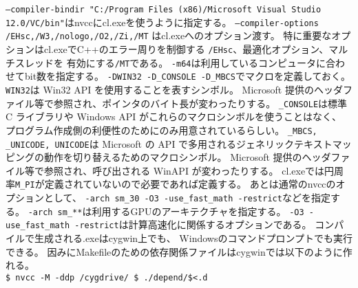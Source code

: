 \texttt{--compiler-bindir "C:/Program Files (x86)/Microsoft Visual Studio 12.0/VC/bin"}はnvccにcl.exeを使うように指定する。
\texttt{--compiler-options  /EHsc,/W3,/nologo,/O2,/Zi,/MT}
はcl.exeへのオプション渡す。
特に重要なオプションはcl.exeでC++のエラー周りを制御する
\texttt{/EHsc}、最適化オプション、マルチスレッドを
有効にする\texttt{/MT}である。
\texttt{-m64}は利用しているコンピュータに合わせてbit数を指定する。
 \texttt{-DWIN32 -D\_CONSOLE -D\_MBCS}でマクロを定義しておく。
\texttt{WIN32}は Win32 API を使用することを表すシンボル。
Microsoft 提供のヘッダファイル等で参照され、ポインタのバイト長が変わったりする。
\texttt{\_CONSOLE}は標準 C ライブラリや Windows API がこれらのマクロシンボルを使うことはなく、
プログラム作成側の利便性のためにのみ用意されているらしい。
\texttt{\_MBCS, \_UNICODE, UNICODE}は
 Microsoft の API で多用されるジェネリックテキストマッピングの動作を切り替えるためのマクロシンボル。
Microsoft 提供のヘッダファイル等で参照され、呼び出される WinAPI が変わったりする。
cl.exeでは円周率\texttt{M\_PI}が定義されていないので必要であれば定義する。
あとは通常のnvccのオプションとして、
\texttt{-arch sm\_30 -O3 -use\_fast\_math -restrict}などを指定する。
\texttt{-arch sm\_**}は利用するGPUのアーキテクチャを指定する。
\texttt{-O3 -use\_fast\_math -restrict}は計算高速化に関係するオプションである。
コンパイルで生成される.exeはcygwin上でも、
Windowsのコマンドプロンプトでも実行できる。
因みにMakefileのための依存関係ファイルはcygwinでは以下のように作れる。\\
\texttt{\$ nvcc -M -ddp /cygdrive/ \$<  >  ./depend/\$<.d}\\










